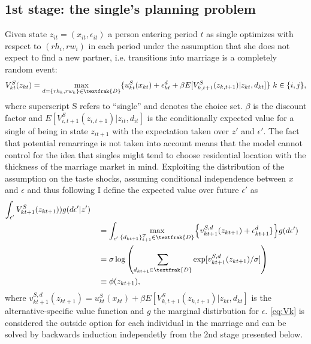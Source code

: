 \subsection{1st stage: the single's planning problem}
Given state $z_{it}=(x_{it},\epsilon_{it})$ a person entering period $t$ as single optimizes with respect to $(rh_i,rw_i)$ in each period under the assumption that she does not expect to find a new partner, i.e. transitions into marriage is a completely random event:
\begin{align}
V_{kt}^S(z_{kt})= \max_{d=\{rh_k,rw_k\}\in \textfrak{D}}\{u_{kt}^S(x_{kt})+\epsilon_{kt}^d+\beta E[V_{k,t+1}^S(z_{k,t+1})|z_{kt},d_{kt}]\} \text{ }k\in\{i,j\},
\label{eq:Vk}
\end{align}
where superscript S refers to ``single'' and  denotes the choice set. $\beta$ is the discount factor and $E[V_{i,t+1}^S(z_{i,t+1})|z_{it},d_{it}]$ is the conditionally expected value for a single of being in state $z_{it+1}$ with the expectation taken over $z'$ and $\epsilon'$. The fact that potential remarriage is not taken into account means that the model cannot control for the idea that singles might tend to choose residential location with the thickness of the marriage market in mind. Exploiting the distribution of the assumption on the taste shocks, assuming conditional independence between $x$ and $\epsilon$ and thus following \cite{Rust1987} I define the expected value over future $\epsilon'$ as
\begin{alignat*}{3}
\int_{\epsilon'}{ V_{kt+1}^S(z_{kt+1}))g(d\epsilon'|z')} \\
& &&= \int_{\epsilon'}{ \max_{\{d_{kt+1}\}_{t+1}^{T}\in \textfrak{D}_{}} } \Big\{v_{kt+1}^{S,d_{}}(z_{kt+1}) +\epsilon_{kt+1}^{d_{}}\} \Big\}g(d\epsilon') \\
& &&=\sigma \log {\left( \sum_{d_{kt+1} \in \textfrak{D}} { \exp[v_{kt+1}^{S,d_{}}(z_{kt+1})/ \sigma]  } \right)} \\
& &&\equiv\phi(z_{kt+1}),
\label{eq:EVk}
\end{alignat*}
where $v_{kt+1}^{S,d_{}}(z_{kt+1})=u_{kt}^S(x_{kt})+\beta E[V_{k,t+1}^S(z_{k,t+1})|z_{kt},d_{kt}]$ is the alternative-specific value function and $g$ the marginal distirbution for $\epsilon$. \eqref{eq:Vk} is considered the outside option for each individual in the marriage and can be solved by backwards induction independetly from the 2nd stage presented below.
 
